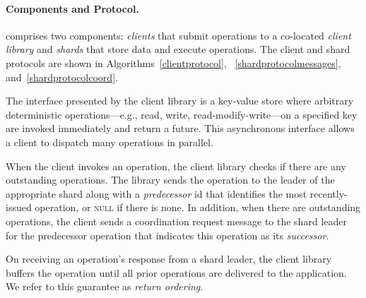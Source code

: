 \paragraph{Components and Protocol.}
\sys{} comprises two components: \textit{clients} that submit operations to a co-located \textit{client library} and \textit{shards} that store data and execute operations.
The client and shard protocols are shown in Algorithms~\ref{clientprotocol}, ~\ref{shardprotocolmessages}, and~\ref{shardprotocolcoord}.


The interface presented by the client library is a key-value store where arbitrary deterministic operations---e.g., read, write, read-modify-write---on a specified key are invoked immediately and return a future.
This asynchronous interface allows a client to dispatch many operations in parallel.


When the client invokes an operation, the client library checks if there are any
outstanding operations.  The library sends the operation to the leader of the
appropriate shard along with a \textit{predecessor} id that identifies the most
recently-issued operation, or \textsc{null} if there is none.  In addition, when
there are outstanding operations, the client sends a coordination request
message to the shard leader for the predecessor operation that indicates this
operation as its \textit{successor}.

On receiving an operation's response from a shard leader, the client library buffers the operation until all prior operations are delivered to the application. We refer to this guarantee as \textit{return ordering}.




